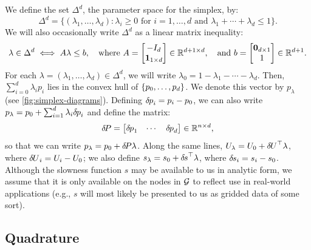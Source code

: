 \documentclass[sisc-eikonal.tex]{subfiles}
\begin{document}
We define the set $\Delta^d$, the parameter space for the simplex, by:
\begin{equation}\label{eq:Delta-set}
  \Delta^d = \big\{(\lambda_1, \hdots, \lambda_d) : \lambda_i \geq 0 \mbox{ for } i = 1, \hdots, d \mbox{ and } \lambda_1 + \cdots + \lambda_d \leq 1\big\}.
\end{equation}
We will also occasionally write $\Delta^d$ as a linear matrix inequality:
\begin{equation}\label{eq:Delta-LMI}
  \lambda \in \Delta^d \iff A\lambda \leq b, \hspace{1em} \mbox{where } A = \begin{bmatrix}
    -I_d \\ \m{1}_{1 \times d}
  \end{bmatrix} \in \mathbb{R}^{d + 1 \times d}, \hspace{1em} \mbox{and }
  b = \begin{bmatrix} \m{0}_{d \times 1} \\ 1 \end{bmatrix} \in \mathbb{R}^{d + 1}.
\end{equation}
For each $\lambda = (\lambda_1, \hdots, \lambda_d) \in \Delta^d$, we
will write $\lambda_0 = 1 - \lambda_1 - \cdots - \lambda_d$. Then,
$\sum_{i=0}^d \lambda_i p_i$ lies in the convex hull of
$\left\{p_0, \hdots, p_d\right\}$. We denote this vector by $p_\lambda$ (see
\cref{fig:simplex-diagrams}). Defining ${\delta \hspace{-0.08em} p}_i = p_i - p_0$, we
can also write $p_\lambda = p_0 + \sum_{i=1}^d \lambda_i {\delta \hspace{-0.08em} p}_i$
and define the matrix:
\begin{equation}
  {\delta \hspace{-0.14em} P} = \begin{bmatrix} {\delta \hspace{-0.08em} p}_1 & \cdots & {\delta \hspace{-0.08em} p}_d \end{bmatrix} \in \mathbb{R}^{n \times d},
\end{equation}
so that we can write $p_\lambda = p_0 + {\delta \hspace{-0.14em} P} \lambda$. Along the same
lines, $U_\lambda = U_0 + {\delta \hspace{-0.09em} U}^\top \lambda$, where
${\delta \hspace{-0.09em} U}_i = U_i - U_0$; we also define
$s_\lambda = s_0 + {\delta \hspace{-0.1em} s}^\top \lambda$, where ${\delta \hspace{-0.1em} s}_i = s_i -
s_0$. Although the slowness function $s$ may be available to us in
analytic form, we assume that it is only available on the nodes in
$\mathcal{G}$ to reflect use in real-world applications (e.g., $s$ will most
likely be presented to us as gridded data of some sort).

\subsection{Quadrature}\label{ssec:quadrature}
\end{document}
